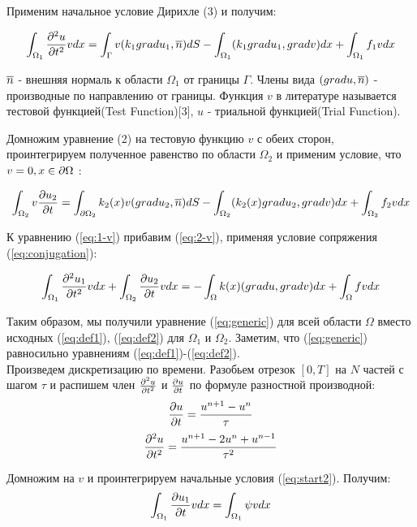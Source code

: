 Применим начальное условие Дирихле (3) и получим:

\begin{equation}
    \int_{\Omega_1} {\frac{\partial^2 u}{\partial t^2}} v dx  = \int_\Gamma v(k_1 gradu_1, \overline{n}) dS - \int_{\Omega_1}(k_1 gradu_1, gradv)dx + \int_{\Omega_1} f_1vdx 
    \label{eq:1-v}
\end{equation}


$\overline{n}$ - внешняя нормаль к области $\Omega_1$ от границы $\Gamma$.
Члены вида $(grad u, \overline{n})$ - производные по направлению от границы. 
Функция $v$ в литературе называется тестовой функцией(Test Function)[3], $u$ - триальной функцией(Trial Function).

Домножим уравнение (2) на тестовую функцию $v$ с обеих сторон, проинтегрируем полученное равенство по области $\Omega_2$ и применим условие, что $v = 0, x \in {\partial \Omega}$ :

\begin{equation}
    \int_{\Omega_2} v{\frac{\partial u_2}{\partial t}} = \int_{{\partial \Omega}_2} k_2(x)v(grad u_2, \overline{n})dS - \int_{\Omega_2}(k_2(x) gradu_2, grad v) dx + \int_{\Omega_2} f_2vdx
    \label{eq:2-v}
\end{equation}


К уравнению (\ref{eq:1-v}) прибавим (\ref{eq:2-v}), применяя условие сопряжения (\ref{eq:conjugation}):

\begin{equation}
    \int_{\Omega_1} {\frac{\partial^2 u_1}{\partial t^2}} v dx + \int_{\Omega_2}{\frac{\partial u_2}{\partial t}}vdx  = -\int_{\Omega} k(x)(gradu, gradv)dx + \int_{\Omega} fv dx
    \label{eq:generic}
\end{equation}


Таким образом, мы получили уравнение (\ref{eq:generic}) для всей области $\Omega$ вместо
исходных (\ref{eq:def1}), (\ref{eq:def2}) для $\Omega_1$ и $\Omega_2$. Заметим, что (\ref{eq:generic}) равносильно уравнениям (\ref{eq:def1})-(\ref{eq:def2}).\\

Произведем дискретизацию по времени. Разобьем отрезок $[0, T]$ на $N$ частей с шагом $\tau$
и распишем член ${\frac{\partial^2 u}{\partial t^2}}$ и ${\frac{\partial u}{\partial t}}$ по формуле разностной производной:
\begin{equation}
     {\frac{\partial u}{\partial t}} = \frac{u^{n+1} - u^{n}}{\tau} 
     \label{eq:pdt-discr}
\end{equation}
\begin{equation}
     {\frac{\partial^2 u}{\partial t^2}} = \frac{u^{n+1} - 2 u^n + u^{n-1}}{\tau^2} 
     \label{eq:pdtt-discr}
\end{equation}

Домножим на $v$ и проинтегрируем начальные условия (\ref{eq:start2}). Получим:
\begin{equation}
    \int_{\Omega_1}{\frac{\partial u_1}{\partial t}}vdx = \int_{\Omega_1}\psi vdx
    \label{eq:psi-v}
\end{equation}

